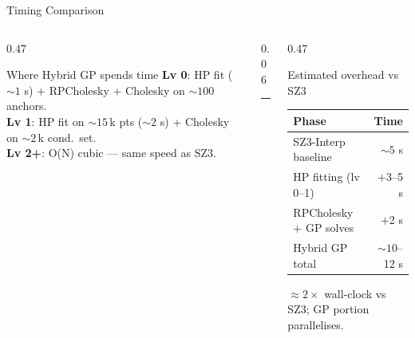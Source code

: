 \documentclass[aspectratio=169, 10pt]{beamer}
\begin{document}
\begin{frame}{Timing Comparison}
\vspace{0.2em}
\begin{columns}[T, totalwidth=\textwidth]

  \begin{column}{0.47\textwidth}
    \begin{block}{Where Hybrid GP spends time}
      \footnotesize
      \textbf{Lv 0}: HP fit (${\sim}1$ s) + RPCholesky + Cholesky on
      ${\sim}100$ anchors.\\[3pt]
      \textbf{Lv 1}: HP fit on ${\sim}15$\,k pts (${\sim}2$ s) +
      Cholesky on ${\sim}2$\,k cond.\ set.\\[3pt]
      \textbf{Lv 2+}: O(N) cubic — same speed as SZ3.
    \end{block}
  \end{column}

  \begin{column}{0.06\textwidth}
    \color{cteal}\rule{1pt}{0.58\textheight}
  \end{column}

  \begin{column}{0.47\textwidth}
    \begin{block}{Estimated overhead vs SZ3}
      \footnotesize
      \begin{tabular}{lr}
        \toprule
        Phase & Time \\
        \midrule
        SZ3-Interp baseline  & ${\sim}5$ s \\
        HP fitting (lv 0--1) & $+$3--5 s \\
        RPCholesky + GP solves & $+$2 s \\
        \midrule
        Hybrid GP total      & ${\sim}10$--12 s \\
        \bottomrule
      \end{tabular}
    \end{block}
    \vspace{3pt}
    {\scriptsize\color{cmuted}
      ${\approx}2\times$ wall-clock vs SZ3; GP portion parallelises.}
  \end{column}

\end{columns}
\end{frame}
\end{document}
